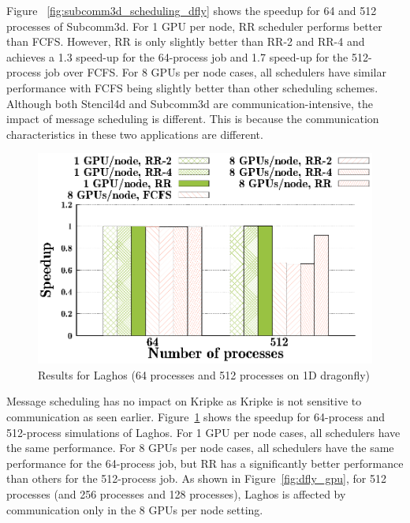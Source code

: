 Figure ~\ref{fig:subcomm3d_scheduling_dfly} shows the speedup for 64 and 512
processes of Subcomm3d.  For 1 GPU per node, RR scheduler performs better
than FCFS. However, RR is only slightly better than RR-2 and RR-4 and achieves a
1.3 speed-up for the 64-process job and 1.7 speed-up for the 512-process job
over FCFS.  For 8 GPUs per node cases, all schedulers have similar performance
with FCFS being slightly better than other scheduling schemes. Although both
Stencil4d and Subcomm3d are communication-intensive, the impact of message
scheduling is different. This is because the communication characteristics in
these two applications are different. 

\begin{figure}[!htbp]
  \centering
  \includegraphics[width=0.8\columnwidth]{figure/plots/sched/dfly-sched-mapping-laghos.eps}
  \vspace{-0.5in}
    \caption{Results for Laghos (64 processes and 512 processes on 1D dragonfly)}
  \label{fig:laghos_scheduling_dfly}
\end{figure}


Message scheduling has no impact on Kripke as Kripke is not sensitive to
communication as seen earlier. Figure~\ref{fig:laghos_scheduling_dfly} shows
the speedup for 64-process and 512-process simulations of Laghos. For 1 GPU per node cases, all
schedulers have the same performance. For 8 GPUs per node cases, all schedulers
have the same performance for the 64-process job, but RR has a significantly
better performance than others for the 512-process job. As shown in
Figure~\ref{fig:dfly_gpu}, for 512 processes (and 256 processes and 128
processes), Laghos is affected by communication only in the 8 GPUs per node
setting.



